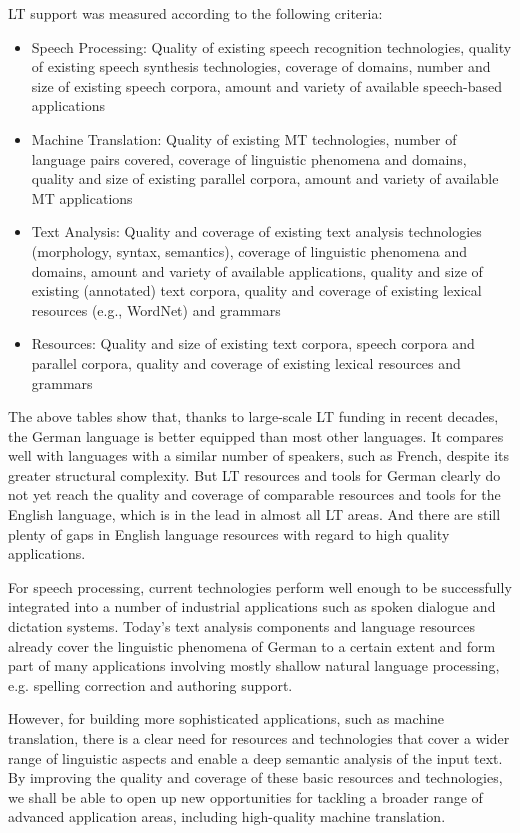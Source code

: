 \documentclass[]{../../metanetpaper}
\begin{document}
\begin{Parallel}[c]{79mm}{78mm}
{LT support was measured according to the following criteria:
\begin{itemize}
\item Speech Processing: Quality of existing speech recognition technologies, quality of existing speech synthesis technologies, coverage of domains, number and size of existing speech corpora, amount and variety of available speech-based applications
\item Machine Translation: Quality of existing MT technologies, number of language pairs covered, coverage of linguistic phenomena and domains, quality and size of existing parallel corpora, amount and variety of available MT applications
\item Text Analysis: Quality and coverage of existing text analysis technologies (morphology, syntax, semantics), coverage of linguistic phenomena and domains, amount and variety of available applications, quality and size of existing (annotated) text corpora, quality and coverage of existing lexical resources (e.g., WordNet) and grammars
\item Resources: Quality and size of existing text corpora, speech corpora and parallel corpora, quality and coverage of existing lexical resources and grammars
\end{itemize} 

The above tables show that, thanks to large-scale LT funding in recent decades, the German language is better equipped than most other languages. It compares well with languages with a similar number of speakers, such as French, despite its greater structural complexity. But LT resources and tools for German clearly do not yet reach the quality and coverage of comparable resources and tools for the English language, which is in the lead in almost all LT areas. And there are still plenty of gaps in English language resources with regard to high quality applications.

For speech processing, current technologies perform well enough to be successfully integrated into a number of industrial applications such as spoken dialogue and dictation systems. Today’s text analysis components and language resources already cover the linguistic phenomena of German to a certain extent and form part of many applications involving mostly shallow natural language processing, e.g. spelling correction and authoring support.

However, for building more sophisticated applications, such as machine translation, there is a clear need for resources and technologies that cover a wider range of linguistic aspects and enable a deep semantic analysis of the input text. By improving the quality and coverage of these basic resources and technologies, we shall be able to open up new opportunities for tackling a broader range of advanced application areas, including high-quality machine translation. 

}
\end{Parallel}
\end{document}
